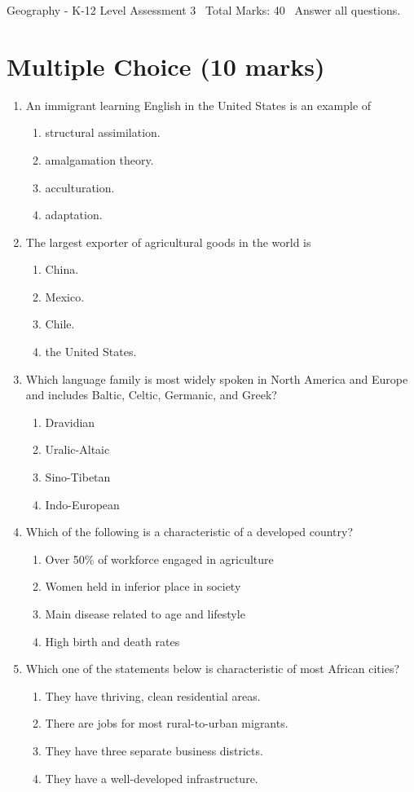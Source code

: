\documentclass[12pt]{article}
\begin{document}
\begin{center}
Geography - K-12 Level Assessment 3 \
Total Marks: 40 \
Answer all questions.
\end{center}

\section*{Multiple Choice (10 marks)}
\begin{enumerate}[label=\arabic*.]
\item An immigrant learning English in the United States is an example of
\begin{enumerate}[label=(\alph*)]
    \item structural assimilation.
    \item amalgamation theory.
    \item acculturation.
    \item adaptation.
\end{enumerate}
\item The largest exporter of agricultural goods in the world is
\begin{enumerate}[label=(\alph*)]
    \item China.
    \item Mexico.
    \item Chile.
    \item the United States.
\end{enumerate}
\item Which language family is most widely spoken in North America and Europe and includes Baltic, Celtic, Germanic, and Greek?
\begin{enumerate}[label=(\alph*)]
    \item Dravidian
    \item Uralic-Altaic
    \item Sino-Tibetan
    \item Indo-European
\end{enumerate}
\item Which of the following is a characteristic of a developed country?
\begin{enumerate}[label=(\alph*)]
    \item Over 50\% of workforce engaged in agriculture
    \item Women held in inferior place in society
    \item Main disease related to age and lifestyle
    \item High birth and death rates
\end{enumerate}
\item Which one of the statements below is characteristic of most African cities?
\begin{enumerate}[label=(\alph*)]
    \item They have thriving, clean residential areas.
    \item There are jobs for most rural-to-urban migrants.
    \item They have three separate business districts.
    \item They have a well-developed infrastructure.
\end{enumerate}
\end{enumerate}
\end{document}
